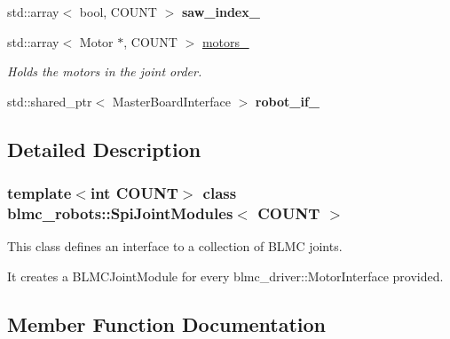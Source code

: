 \begin{DoxyCompactItemize}
\item 
\mbox{\label{classblmc__robots_1_1SpiJointModules_a039c25eda9a899f86787f4adfc5a0339}} 
std\+::array$<$ bool, C\+O\+U\+NT $>$ {\bfseries saw\+\_\+index\+\_\+}
\item 
\mbox{\label{classblmc__robots_1_1SpiJointModules_a75e008104482474a6d5120ac43cb15a2}} 
std\+::array$<$ Motor $\ast$, C\+O\+U\+NT $>$ \hyperlink{classblmc__robots_1_1SpiJointModules_a75e008104482474a6d5120ac43cb15a2}{motors\+\_\+}
\begin{DoxyCompactList}\small\item\em Holds the motors in the joint order. \end{DoxyCompactList}\item 
\mbox{\label{classblmc__robots_1_1SpiJointModules_a4b0c786e8d478d6c85955d01439ccd46}} 
std\+::shared\+\_\+ptr$<$ Master\+Board\+Interface $>$ {\bfseries robot\+\_\+if\+\_\+}
\end{DoxyCompactItemize}


\subsection{Detailed Description}
\subsubsection*{template$<$int C\+O\+U\+NT$>$\newline
class blmc\+\_\+robots\+::\+Spi\+Joint\+Modules$<$ C\+O\+U\+N\+T $>$}

This class defines an interface to a collection of B\+L\+MC joints. 

It creates a B\+L\+M\+C\+Joint\+Module for every blmc\+\_\+driver\+::\+Motor\+Interface provided. 

\subsection{Member Function Documentation}
\mbox{\label{classblmc__robots_1_1SpiJointModules_a84c6efc9eddde57a1409c724193f3c50}} 
